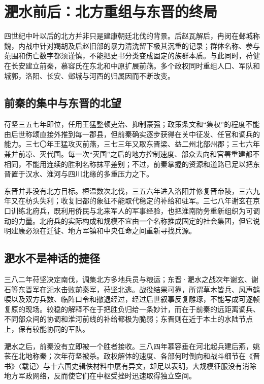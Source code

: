 \section{淝水前后：北方重组与东晋的终局}
\label{sec:eastern-jin-fei-river-liu-yu}

四世纪中叶以后的北方并非只是建康朝廷北伐的背景。后赵瓦解后，冉闵在邺城称魏，内战中针对羯胡及后赵旧部的暴力清洗留下极其沉重的记录；群体名称、参与范围和伤亡数字都须谨慎，不能把史书分类变成固定的族群本质。与此同时，苻健在长安建立前秦，慕容氏在东北和中原扩展前燕。多个政权同时重组人口、军队和城郭，洛阳、长安、邺城与河西的归属因而不断改变。

\subsection{前秦的集中与东晋的北望}

苻坚三五七年即位，任用王猛整顿吏治、抑制豪强；政策条文和“集权”的程度不能由后世称颂直接外推到每一郡县，但前秦确实逐步获得在关中征发、任官和调兵的能力。三七〇年王猛攻灭前燕，三七三年又取东晋梁、益二州北部州郡；三七六年兼并前凉、灭代国。每一次“灭国”之后的地方控制速度、部众去向和官署重建都不相同，不能用连续的胜利名称抹平差别；不过，前秦掌握的资源和道路已足以把东晋置于汉水、淮河与四川北缘的多重压力之下。

东晋并非没有北方目标。桓温数次北伐，三五六年进入洛阳并修复晋帝陵，三六九年又在枋头失利；收复旧都的象征不能取代稳定的补给和驻军。三七八年谢玄在京口训练北府兵，既利用侨民与北来军人的军事经验，也把淮南防务重新组织为可调动的力量。北府兵的实际构成和规模不宜由一个名称推成固定的社会集团，但它说明建康必须在迁徙、地方军镇和中央任命之间重新寻找兵源。

\subsection{淝水不是神话的捷径}

三八二年苻坚决定南伐，调集北方多地兵员与粮运；\hypertarget{evt:JH-0383-FEI-RIVER}{\textcolor{dynasty}{东晋·淝水之战}}次年谢玄、谢石等东晋军在淝水击败前秦军，苻坚北逃。战役结果可靠，所谓草木皆兵、风声鹤唳以及双方兵数、临阵口令和撤退经过，经过后世叙事反复雕琢，不能写成可逐帧复原的现场。较稳的解释不在于把胜负归给一条妙计，而在于前秦的远距离调兵、不同部众间的协调和淮河前线的补给都极为脆弱；东晋则在近于本土的水陆节点上，保有较能协同的军队。

淝水之后，前秦没有立即被一个胜者接收。三八四年慕容垂在河北起兵建后燕，姚苌在北地称秦；次年苻坚被杀。政权解体的速度、各部何时倒向和战斗细节在《晋书》〈载记〉与十六国史辑佚材料中屡有异文，却足以表明，大规模征服没有消除地方军政网络，反而使它们在中枢受挫时迅速取得独立空间。


